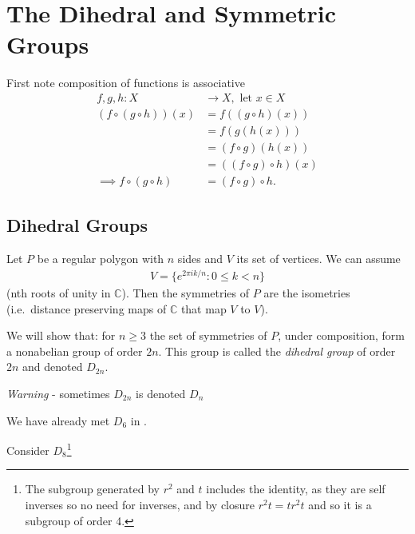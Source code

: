
\hypertarget{the-dihedral-and-symmetric-groups}{%
\section{The Dihedral and Symmetric Groups}\label{the-dihedral-and-symmetric-groups}}

First note composition of functions is associative
\begin{align*}
    f, g, h: X &\to X, \text{ let } x \in X \\
    (f \circ (g \circ h))(x) &= f((g \circ h)(x)) \\
    &= f(g(h(x))) \\
    &= (f \circ g)(h(x)) \\
    &= ((f \circ g) \circ h)(x) \\
    \implies f \circ (g \circ h) &= (f \circ g) \circ h.
\end{align*}

\hypertarget{dihedral-groups}{%
\subsection{Dihedral Groups}\label{dihedral-groups}}

\begin{definition}
  Let \(P\) be a regular polygon with \(n\) sides and \(V\) its set of vertices.
  We can assume
  \begin{align*}
      V = \{ e^{2\pi i k /n} : 0 \leq k < n \}   
  \end{align*} (nth roots of unity in \(\mathbb{C}\)).
  Then the symmetries of \(P\) are the isometries (i.e.~distance preserving maps of \(\mathbb{C}\) that map \(V\) to \(V\)).
  
  We will show that:
  for \(n \geq 3\) the set of symmetries of \(P\), under composition, form a nonabelian group of order \(2n\). This group is called the \emph{dihedral group} of order \(2n\) and denoted \(D_{2n}\).
\end{definition} 

\emph{Warning} - sometimes \(D_{2n}\) is denoted \(D_n\)

We have already met \(D_6\) in .

Consider \(D_8\)\footnote{The subgroup generated by \(r^2\) and \(t\) includes the identity, as they are self inverses so no need for inverses, and by closure \(r^2t = tr^2t\) and so it is a subgroup of order 4.}

